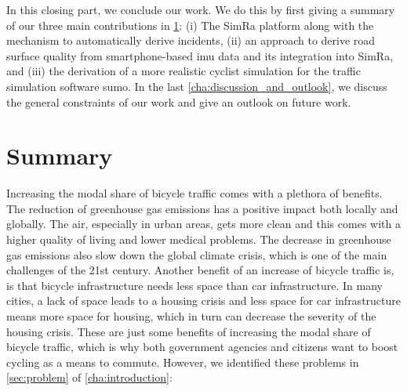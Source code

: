 \vspace*{\fill}
In this closing part, we conclude our work.
We do this by first giving a summary of our three main contributions in \cref{cha:summary}: (i) The SimRa platform along with the mechanism to automatically derive incidents, (ii) an approach to derive road surface quality from smartphone-based \ac{imu} data and its integration into SimRa, and (iii) the derivation of a more realistic cyclist simulation for the traffic simulation software \ac{sumo}.
In the last \cref{cha:discussion_and_outlook}, we discuss the general constraints of our work and give an outlook on future work.
\vspace*{\fill}
\chapter{Summary}
\label{cha:summary}
Increasing the modal share of bicycle traffic comes with a plethora of benefits.
The reduction of greenhouse gas emissions has a positive impact both locally and globally.
The air, especially in urban areas, gets more clean and this comes with a higher quality of living and lower medical problems.
The decrease in greenhouse gas emissions also slow down the global climate crisis, which is one of the main challenges of the 21st century.
Another benefit of an increase of bicycle traffic is, is that bicycle infrastructure needs less space than car infrastructure.
In many cities, a lack of space leads to a housing crisis and less space for car infrastructure means more space for housing, which in turn can decrease the severity of the housing crisis.
These are just some benefits of increasing the modal share of bicycle traffic, which is why both government agencies and citizens want to boost cycling as a means to commute.
However, we identified these problems in \cref{sec:problem} of \cref{cha:introduction}:

